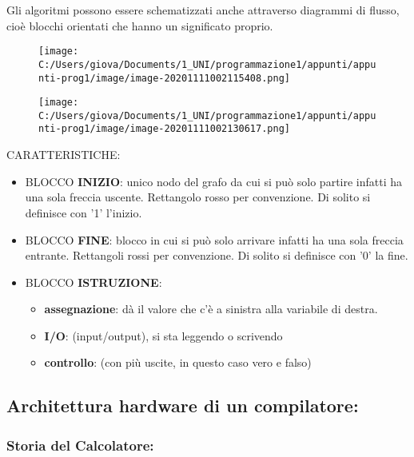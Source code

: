 \documentclass[
]{article}
\begin{document}
Gli algoritmi possono essere schematizzati anche attraverso diagrammi di
flusso, cioè blocchi orientati che hanno un significato proprio.

\begin{figure}
\centering
\texttt{[image: C:/Users/giova/Documents/1\_UNI/programmazione1/appunti/appunti-prog1/image/image-20201111002115408.png]}
\caption{}
\end{figure}

\begin{figure}
\centering
\texttt{[image: C:/Users/giova/Documents/1\_UNI/programmazione1/appunti/appunti-prog1/image/image-20201111002130617.png]}
\caption{}
\end{figure}

CARATTERISTICHE:

\begin{itemize}
\item
  BLOCCO \textbf{INIZIO}: unico nodo del grafo da cui si può solo
  partire infatti ha una sola freccia uscente. Rettangolo rosso per
  convenzione. Di solito si definisce con '1' l'inizio.
\item
  BLOCCO \textbf{FINE}: blocco in cui si può solo arrivare infatti ha
  una sola freccia entrante. Rettangoli rossi per convenzione. Di solito
  si definisce con '0' la fine.
\item
  BLOCCO \textbf{ISTRUZIONE}:

  \begin{itemize}
  \item
    \textbf{assegnazione}: dà il valore che c'è a sinistra alla
    variabile di destra.
  \item
    \textbf{I/O}: (input/output), si sta leggendo o scrivendo
  \item
    \textbf{controllo}: (con più uscite, in questo caso vero e falso)
  \end{itemize}
\end{itemize}

\hypertarget{header-n96}{%
\subsection{Architettura hardware di un compilatore:}\label{header-n96}}

\hypertarget{header-n97}{%
\subsubsection{Storia del Calcolatore:}\label{header-n97}}
\end{document}
